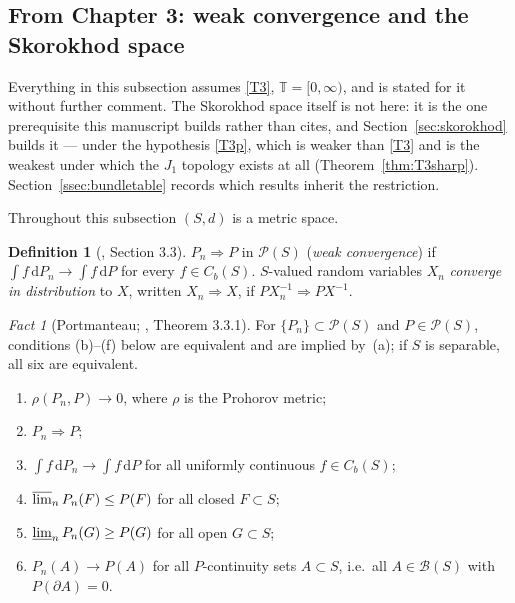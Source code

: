 \documentclass[11pt,a4paper]{article}
\theoremstyle{plain}
\theoremstyle{definition}
\newtheorem{definition}[theorem]{Definition}
\theoremstyle{remark}
\newtheorem{fact}[theorem]{Fact}
\newcommand{\T}{\mathbb{T}}                     %
\newcommand{\Bor}{\mathcal{B}}                 %
\newcommand{\Cb}{C_b}                          %
\newcommand{\Prob}{\mathcal{P}}                %
\newcommand{\dif}{\,\mathrm{d}}
\DeclareMathOperator*{\wto}{\Rightarrow}
\newcommand{\EK}{\cite{EK86}}
\begin{document}
\subsection{From Chapter 3: weak convergence and the Skorokhod space}
\label{ssec:ch3}

Everything in this subsection assumes \eqref{T3}, $\T = [0,\infty)$, and is
stated for it without further comment.  The Skorokhod space itself is not here:
it is the one prerequisite this manuscript builds rather than cites, and
Section~\ref{sec:skorokhod} builds it --- under the hypothesis \eqref{T3p}, which
is weaker than \eqref{T3} and is the weakest under which the $J_1$ topology
exists at all (Theorem~\ref{thm:T3sharp}).  Section~\ref{ssec:bundletable}
records which results inherit the restriction.

Throughout this subsection $(S,d)$ is a metric space.

\begin{definition}[\EK, Section 3.3]
  \label{def:weakconv}
  $P_n \wto P$ in $\Prob(S)$ (\emph{weak convergence}) if
  $\int f \dif P_n \to \int f \dif P$ for every $f \in \Cb(S)$.  $S$-valued
  random variables $X_n$ \emph{converge in distribution} to $X$, written
  $X_n \wto X$, if $P X_n^{-1} \wto P X^{-1}$.
\end{definition}

\begin{fact}[Portmanteau; \EK, Theorem 3.3.1]
  \label{fact:portmanteau}
  For $\{P_n\} \subset \Prob(S)$ and $P \in \Prob(S)$, conditions (b)--(f) below
  are equivalent and are implied by~(a); if $S$ is separable, all six are
  equivalent.
  \begin{enumerate}[label=(\alph*), nosep]
  \item $\rho(P_n, P) \to 0$, where $\rho$ is the Prohorov metric;
  \item $P_n \wto P$;
  \item $\int f \dif P_n \to \int f \dif P$ for all uniformly continuous
    $f \in \Cb(S)$;
  \item $\varlimsup_n P_n(F) \leq P(F)$ for all closed $F \subset S$;
  \item $\varliminf_n P_n(G) \geq P(G)$ for all open $G \subset S$;
  \item $P_n(A) \to P(A)$ for all $P$-continuity sets $A \subset S$, i.e.\ all
    $A \in \Bor(S)$ with $P(\partial A) = 0$.
  \end{enumerate}
\end{fact}
\end{document}
